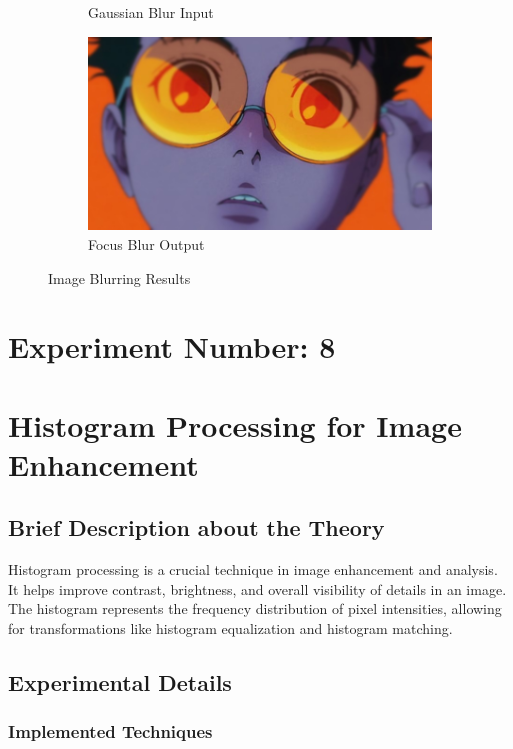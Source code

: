 \documentclass[12pt,a4paper]{article}
\begin{document}
\begin{figure}[H]
\begin{subfigure}[b]{0.45\textwidth}
    \caption{Gaussian Blur Input}
  \end{subfigure}
  \hfill
  \begin{subfigure}[b]{0.45\textwidth}
    \includegraphics[width=\textwidth]{blurring/focus_blur_r100.jpg}
    \caption{Focus Blur Output}
  \end{subfigure}
  \caption{Image Blurring Results}
  \label{fig:blurring}
\end{figure}

\newpage
\section*{Experiment Number: 8}
\section{Histogram Processing for Image Enhancement}

\subsection{Brief Description about the Theory}
Histogram processing is a crucial technique in image enhancement and analysis. It helps improve contrast, brightness, and overall visibility of details in an image. The histogram represents the frequency distribution of pixel intensities, allowing for transformations like histogram equalization and histogram matching.

\subsection{Experimental Details}
\subsubsection{Implemented Techniques}
\end{document}
